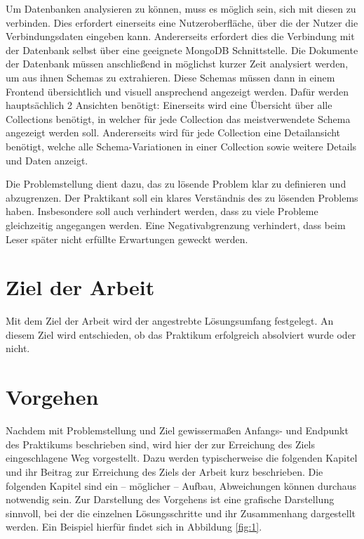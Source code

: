 Um Datenbanken analysieren zu können, muss es möglich sein, sich mit diesen zu verbinden.
Dies erfordert einerseits eine Nutzeroberfläche, über die der Nutzer die Verbindungsdaten eingeben kann.
Andererseits erfordert dies die Verbindung mit der Datenbank selbst über eine geeignete MongoDB Schnittstelle.
Die Dokumente der Datenbank müssen anschließend in möglichst kurzer Zeit analysiert werden, um aus ihnen Schemas zu extrahieren.
Diese Schemas müssen dann in einem Frontend übersichtlich und visuell ansprechend angezeigt werden.
Dafür werden hauptsächlich 2 Ansichten benötigt:
Einerseits wird eine Übersicht über alle Collections benötigt, in welcher  für jede Collection das meistverwendete Schema angezeigt werden soll.
Andererseits wird für jede Collection eine Detailansicht benötigt, welche alle Schema-Variationen in einer Collection sowie  weitere Details und Daten anzeigt.


Die Problemstellung dient dazu, das zu lösende Problem klar zu 
definieren und abzugrenzen. Der Praktikant soll ein klares Verständnis 
des zu lösenden Problems haben. Insbesondere soll auch verhindert 
werden, dass zu viele Probleme gleichzeitig angegangen werden. Eine 
Negativabgrenzung verhindert, dass beim Leser später nicht erfüllte 
Erwartungen geweckt werden.

\section{Ziel der Arbeit}
\label{sec:ziel}

Mit dem Ziel der Arbeit wird der angestrebte Lösungsumfang festgelegt. An diesem Ziel wird entschieden, ob das Praktikum erfolgreich absolviert wurde oder nicht.

\section{Vorgehen}
\label{sec:vorgehen}

Nachdem mit Problemstellung und Ziel gewissermaßen Anfangs- und Endpunkt 
des Praktikums beschrieben sind, wird hier der zur Erreichung des Ziels 
eingeschlagene Weg vorgestellt. Dazu werden typischerweise die folgenden 
Kapitel und ihr Beitrag zur Erreichung des Ziels der Arbeit kurz 
beschrieben. Die folgenden Kapitel sind ein – möglicher – Aufbau, 
Abweichungen können durchaus notwendig sein. Zur Darstellung des 
Vorgehens ist eine grafische Darstellung sinnvoll, bei der die einzelnen 
Lösungsschritte und ihr Zusammenhang dargestellt werden. Ein Beispiel 
hierfür findet sich in Abbildung \ref{fig:1}.


